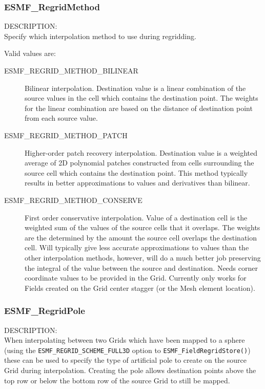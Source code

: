


\subsubsection{ESMF\_RegridMethod}
\label{opt:regridmethod}
{\sf DESCRIPTION:\\}  
Specify which interpolation method to use during regridding. 

Valid values are:
\begin{description}
\item [ESMF\_REGRID\_METHOD\_BILINEAR]
      Bilinear interpolation. Destination value is a linear combination of the source values in the cell which contains the destination point. The weights for the linear combination are based on the distance of destination point from each source value. 
\item [ESMF\_REGRID\_METHOD\_PATCH]
      Higher-order patch recovery interpolation. Destination value is a weighted average of 2D polynomial patches constructed from cells surrounding the source cell which contains the destination point. This method typically results in better approximations to values and derivatives than bilinear. 
\item [ESMF\_REGRID\_METHOD\_CONSERVE]
      First order conservative interpolation. Value of a destination cell is the weighted sum of the values of the source cells that it overlaps. The weights are the determined by the amount the source cell overlaps the destination cell. Will typically give less accurate approximations to values than the other interpolation methods, however, will do a much better job preserving the integral of the value between the source and destination.  Needs corner coordinate values to be provided in the Grid. Currently only works for Fields created on the Grid center stagger (or the Mesh element location). 
\end{description}

\subsubsection{ESMF\_RegridPole}
\label{opt:regridpole}
{\sf DESCRIPTION:\\}  
When interpolating between two Grids which have been mapped to a sphere (using the {\tt ESMF\_REGRID\_SCHEME\_FULL3D} option to {\tt ESMF\_FieldRegridStore()}) these can be used to specify the type of artificial pole to create on the source Grid during interpolation. Creating the pole allows destination points above the top row or below the bottom row of the source Grid to still be mapped.

